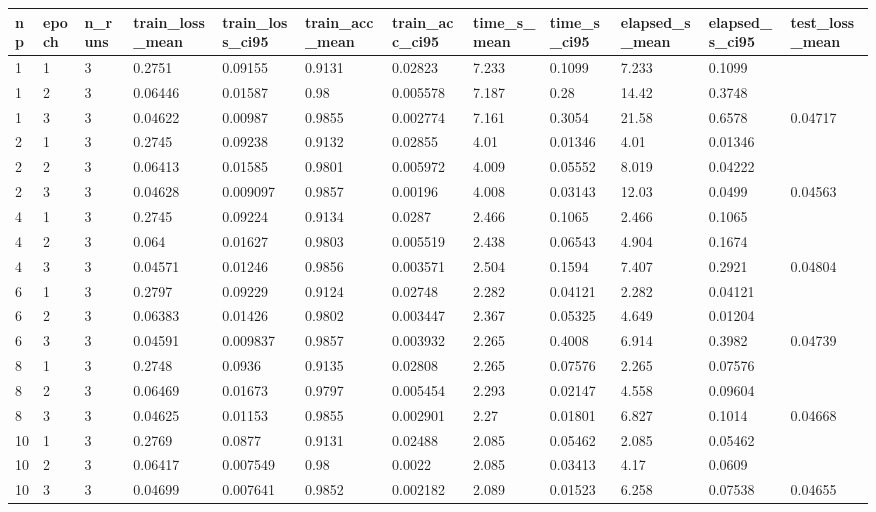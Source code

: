 \begin{tabular}{llllllllllll}
\hline
np & epoch & n\_runs & train\_loss\_mean & train\_loss\_ci95 & train\_acc\_mean & train\_acc\_ci95 & time\_s\_mean & time\_s\_ci95 & elapsed\_s\_mean & elapsed\_s\_ci95 & test\_loss\_mean \\
\hline
1 & 1 & 3 & 0.2751 & 0.09155 & 0.9131 & 0.02823 & 7.233 & 0.1099 & 7.233 & 0.1099 &  \\
1 & 2 & 3 & 0.06446 & 0.01587 & 0.98 & 0.005578 & 7.187 & 0.28 & 14.42 & 0.3748 &  \\
1 & 3 & 3 & 0.04622 & 0.00987 & 0.9855 & 0.002774 & 7.161 & 0.3054 & 21.58 & 0.6578 & 0.04717 \\
2 & 1 & 3 & 0.2745 & 0.09238 & 0.9132 & 0.02855 & 4.01 & 0.01346 & 4.01 & 0.01346 &  \\
2 & 2 & 3 & 0.06413 & 0.01585 & 0.9801 & 0.005972 & 4.009 & 0.05552 & 8.019 & 0.04222 &  \\
2 & 3 & 3 & 0.04628 & 0.009097 & 0.9857 & 0.00196 & 4.008 & 0.03143 & 12.03 & 0.0499 & 0.04563 \\
4 & 1 & 3 & 0.2745 & 0.09224 & 0.9134 & 0.0287 & 2.466 & 0.1065 & 2.466 & 0.1065 &  \\
4 & 2 & 3 & 0.064 & 0.01627 & 0.9803 & 0.005519 & 2.438 & 0.06543 & 4.904 & 0.1674 &  \\
4 & 3 & 3 & 0.04571 & 0.01246 & 0.9856 & 0.003571 & 2.504 & 0.1594 & 7.407 & 0.2921 & 0.04804 \\
6 & 1 & 3 & 0.2797 & 0.09229 & 0.9124 & 0.02748 & 2.282 & 0.04121 & 2.282 & 0.04121 &  \\
6 & 2 & 3 & 0.06383 & 0.01426 & 0.9802 & 0.003447 & 2.367 & 0.05325 & 4.649 & 0.01204 &  \\
6 & 3 & 3 & 0.04591 & 0.009837 & 0.9857 & 0.003932 & 2.265 & 0.4008 & 6.914 & 0.3982 & 0.04739 \\
8 & 1 & 3 & 0.2748 & 0.0936 & 0.9135 & 0.02808 & 2.265 & 0.07576 & 2.265 & 0.07576 &  \\
8 & 2 & 3 & 0.06469 & 0.01673 & 0.9797 & 0.005454 & 2.293 & 0.02147 & 4.558 & 0.09604 &  \\
8 & 3 & 3 & 0.04625 & 0.01153 & 0.9855 & 0.002901 & 2.27 & 0.01801 & 6.827 & 0.1014 & 0.04668 \\
10 & 1 & 3 & 0.2769 & 0.0877 & 0.9131 & 0.02488 & 2.085 & 0.05462 & 2.085 & 0.05462 &  \\
10 & 2 & 3 & 0.06417 & 0.007549 & 0.98 & 0.0022 & 2.085 & 0.03413 & 4.17 & 0.0609 &  \\
10 & 3 & 3 & 0.04699 & 0.007641 & 0.9852 & 0.002182 & 2.089 & 0.01523 & 6.258 & 0.07538 & 0.04655 \\
\hline
\end{tabular}
